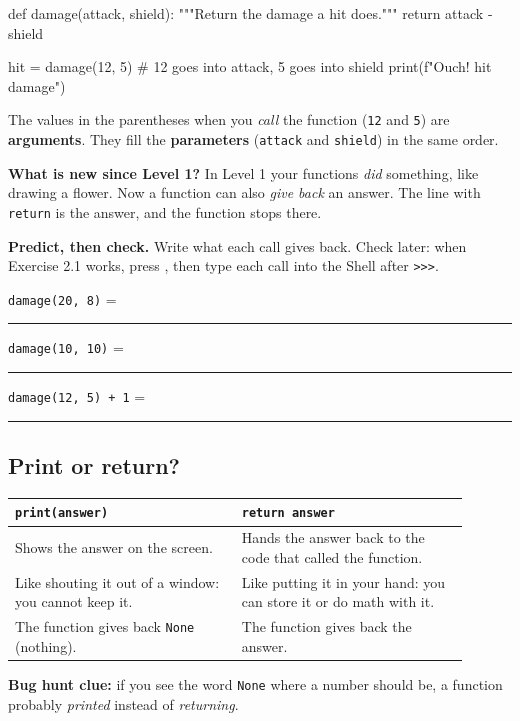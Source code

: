 \begin{pycode}
def damage(attack, shield):
    """Return the damage a hit does."""
    return attack - shield

hit = damage(12, 5)       # 12 goes into attack, 5 goes into shield
print(f"Ouch! {hit} damage")
\end{pycode}
The values in the parentheses when you \emph{call} the function (\texttt{12} and \texttt{5}) are \textbf{arguments}.
They fill the \textbf{parameters} (\texttt{attack} and \texttt{shield}) in the same order.

\textbf{What is new since Level 1?} In Level 1 your functions \emph{did} something, like drawing a flower.
Now a function can also \emph{give back} an answer. The line with \texttt{return} is the answer, and the function stops there.

\textbf{Predict, then check.} Write what each call gives back. Check later: when Exercise 2.1 works, press ,
then type each call into the Shell after \texttt{>>>}.\par
\texttt{damage(20, 8)} = \rule{1.5cm}{0.4pt}\qquad \texttt{damage(10, 10)} = \rule{1.5cm}{0.4pt}\qquad \texttt{damage(12, 5) + 1} = \rule{1.5cm}{0.4pt}

\subsection{Print or return?}
\begin{center}
\renewcommand{\arraystretch}{1.3}
\begin{tabular}{@{}p{0.45\linewidth}p{0.45\linewidth}@{}}
\toprule
\textbf{\texttt{print(answer)}} & \textbf{\texttt{return answer}} \\ \midrule
Shows the answer on the screen. & Hands the answer back to the code that called the function. \\
Like shouting it out of a window: you cannot keep it. & Like putting it in your hand: you can store it or do math with it. \\
The function gives back \texttt{None} (nothing). & The function gives back the answer. \\ \bottomrule
\end{tabular}
\end{center}

\textbf{Bug hunt clue:} if you see the word \texttt{None} where a number should be, a function probably \emph{printed}
instead of \emph{returning}.

